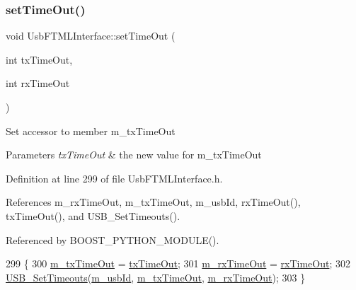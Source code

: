 \subsubsection{\texorpdfstring{set\+Time\+Out()}{setTimeOut()}}
{\footnotesize\ttfamily void Usb\+F\+T\+M\+L\+Interface\+::set\+Time\+Out (\begin{DoxyParamCaption}\item[{int}]{tx\+Time\+Out,  }\item[{int}]{rx\+Time\+Out }\end{DoxyParamCaption})\hspace{0.3cm}{\ttfamily [inline]}}

Set accessor to member m\+\_\+tx\+Time\+Out 
\begin{DoxyParams}{Parameters}
{\em tx\+Time\+Out} & the new value for m\+\_\+tx\+Time\+Out \\
\hline
\end{DoxyParams}


Definition at line 299 of file Usb\+F\+T\+M\+L\+Interface.\+h.



References m\+\_\+rx\+Time\+Out, m\+\_\+tx\+Time\+Out, m\+\_\+usb\+Id, rx\+Time\+Out(), tx\+Time\+Out(), and U\+S\+B\+\_\+\+Set\+Timeouts().



Referenced by B\+O\+O\+S\+T\+\_\+\+P\+Y\+T\+H\+O\+N\+\_\+\+M\+O\+D\+U\+L\+E().


\begin{DoxyCode}
299                                                 \{
300     \hyperlink{classUsbFTMLInterface_a48cd0df4e1d8fd53d96b208b5b9c7061}{m\_txTimeOut} = \hyperlink{classUsbFTMLInterface_ad7e76fd952273faf094bf3475b2963da}{txTimeOut};
301     \hyperlink{classUsbFTMLInterface_a4e3a413912cb5f61b5885c0d22e6c179}{m\_rxTimeOut} = \hyperlink{classUsbFTMLInterface_a106df14066462a38f7e4849c9d15828a}{rxTimeOut};
302     \hyperlink{LALUsbML_8h_a217702d9c80d1bb65ce8703c0a7382fa}{USB\_SetTimeouts}(\hyperlink{classUsbFTMLInterface_aab6754587c303660d5c498ce34a2b4c8}{m\_usbId}, \hyperlink{classUsbFTMLInterface_a48cd0df4e1d8fd53d96b208b5b9c7061}{m\_txTimeOut}, 
      \hyperlink{classUsbFTMLInterface_a4e3a413912cb5f61b5885c0d22e6c179}{m\_rxTimeOut});
303   \}
\end{DoxyCode}
\mbox{\label{classUsbFTMLInterface_a00dc58835d65f98593e15287c1c8c6ab}} 
